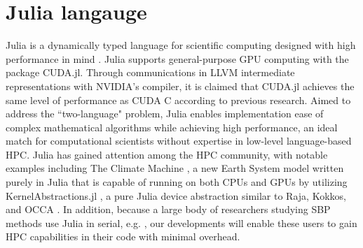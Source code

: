 \section{Julia langauge}

Julia is a dynamically typed language for scientific computing designed with high performance in mind \citep{bezanson2017julia}.
 Julia supports general-purpose GPU computing with the package CUDA.jl. Through communications in LLVM intermediate representations with NVIDIA's compiler, it is claimed that CUDA.jl achieves the same level of performance as CUDA C according to previous research\citep{besard2018effective}.
Aimed to address the ``two-language" problem, Julia enables implementation ease of complex mathematical algorithms while achieving high performance, an ideal match for computational scientists without expertise in low-level language-based HPC. Julia has gained attention among the HPC community, with notable examples including The Climate Machine \citep{clima}, a new Earth System model written purely in Julia that is capable of running on both CPUs and GPUs by utilizing KernelAbstractions.jl \citep{valentin_churavy_2024_10780635}, a pure Julia device abstraction similar to Raja, Kokkos, and OCCA \citep{8945721, CARTEREDWARDS20143202, Medina}. In addition, because a large body of researchers studying SBP methods use Julia in serial, e.g. \citep{Kozdon2020HybridizedSF,ranocha2021new}, our developments will enable these users to gain HPC capabilities in their code with minimal overhead.
